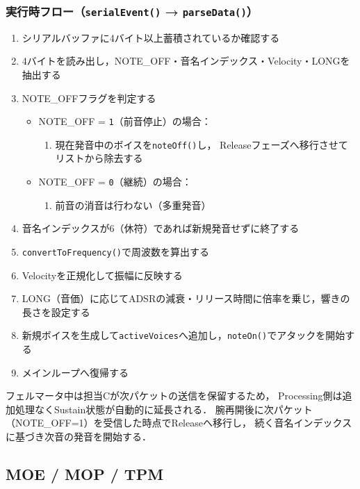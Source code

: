 \subsubsection*{実行時フロー（\texttt{serialEvent()} → \texttt{parseData()}）}

\begin{enumerate}
  \item シリアルバッファに4バイト以上蓄積されているか確認する
  \item 4バイトを読み出し，NOTE\_OFF・音名インデックス・Velocity・LONGを抽出する
  \item NOTE\_OFFフラグを判定する
  \begin{itemize}
    \item NOTE\_OFF = \texttt{1}（前音停止）の場合：
    \begin{enumerate}
      \item 現在発音中のボイスを\texttt{noteOff()}し，
            Releaseフェーズへ移行させてリストから除去する
    \end{enumerate}
    \item NOTE\_OFF = \texttt{0}（継続）の場合：
    \begin{enumerate}
      \item 前音の消音は行わない（多重発音）
    \end{enumerate}
  \end{itemize}
  \item 音名インデックスが6（休符）であれば新規発音せずに終了する
  \item \texttt{convertToFrequency()}で周波数を算出する
  \item Velocityを正規化して振幅に反映する
  \item LONG（音価）に応じてADSRの減衰・リリース時間に倍率を乗じ，響きの長さを設定する
  \item 新規ボイスを生成して\texttt{activeVoices}へ追加し，\texttt{noteOn()}でアタックを開始する
  \item メインループへ復帰する
\end{enumerate}

フェルマータ中は担当Cが次パケットの送信を保留するため，
Processing側は追加処理なくSustain状態が自動的に延長される．
腕再開後に次パケット（NOTE\_OFF=1）を受信した時点でReleaseへ移行し，
続く音名インデックスに基づき次音の発音を開始する．


\subsection{MOE / MOP / TPM}

